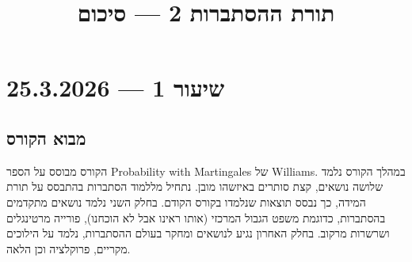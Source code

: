 
\title{תורת ההסתברות 2 --- סיכום}
\setcounter{secnumdepth}{2}

\usepackage{fancyhdr}
\pagestyle{fancy}
\renewcommand{\headrulewidth}{0pt}


\maketitle
\maketitleprint[teal]{}

\tableofcontents

\section{שיעור 1 --- 25.3.2026}

\subsection{מבוא הקורס}
הקורס מבוסס על הספר Probability with Martingales של Williams.
במהלך הקורס נלמד שלושה נושאים, קצת סותרים באיזשהו מובן.
נתחיל מללמוד הסתברות בהתבסס על תורת המידה, כך נבסס תוצאות שנלמדו בקורס הקודם.
בחלק השני נלמד נושאים מתקדמים בהסתברות, כדוגמת משפט הגבול המרכזי (אותו ראינו אבל לא הוכחנו), פורייה מרטינגלים ושרשרות מרקוב.
בחלק האחרון נגיע לנושאים ומחקר בעולם ההסתברות, נלמד על הילוכים מקריים, פרוקלציה וכן הלאה.

